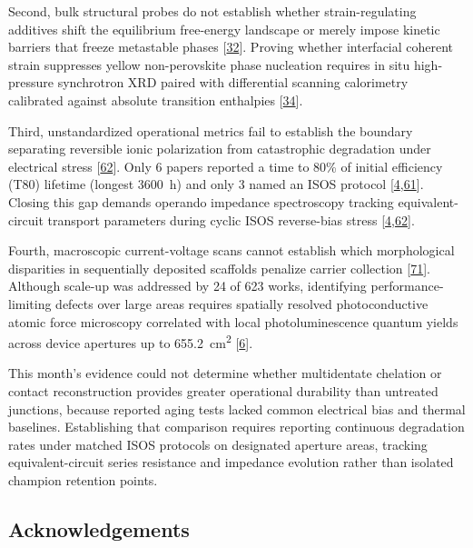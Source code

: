 \documentclass[
  11pt,
]{article}
\begin{document}
Second, bulk structural probes do not establish whether
strain-regulating additives shift the equilibrium free-energy landscape
or merely impose kinetic barriers that freeze metastable phases
{[}\href{https://doi.org/10.22541/authorea.15004927/v1}{32}{]}. Proving
whether interfacial coherent strain suppresses yellow non-perovskite
phase nucleation requires in situ high-pressure synchrotron XRD paired
with differential scanning calorimetry calibrated against absolute
transition enthalpies
{[}\href{https://doi.org/10.1038/s41467-026-73739-0}{34}{]}.

Third, unstandardized operational metrics fail to establish the boundary
separating reversible ionic polarization from catastrophic degradation
under electrical stress
{[}\href{https://doi.org/10.1021/acsenergylett.6c00904}{62}{]}. Only 6
papers reported a time to 80\% of initial efficiency (T80) lifetime
(longest \qty{3600}{\hour}) and only 3 named an ISOS protocol
{[}\href{https://doi.org/10.1126/sciadv.aef6596}{4},\href{https://doi.org/10.1016/j.joule.2026.102538}{61}{]}.
Closing this gap demands operando impedance spectroscopy tracking
equivalent-circuit transport parameters during cyclic ISOS reverse-bias
stress
{[}\href{https://doi.org/10.1126/sciadv.aef6596}{4},\href{https://doi.org/10.1021/acsenergylett.6c00904}{62}{]}.

Fourth, macroscopic current-voltage scans cannot establish which
morphological disparities in sequentially deposited scaffolds penalize
carrier collection
{[}\href{https://doi.org/10.1021/acsami.6c07582}{71}{]}. Although
scale-up was addressed by 24 of 623 works, identifying
performance-limiting defects over large areas requires spatially
resolved photoconductive atomic force microscopy correlated with local
photoluminescence quantum yields across device apertures up to
\qty{655.2}{\centi\meter\squared}
{[}\href{https://doi.org/10.1002/adma.73855}{6}{]}.

This month's evidence could not determine whether multidentate chelation
or contact reconstruction provides greater operational durability than
untreated junctions, because reported aging tests lacked common
electrical bias and thermal baselines. Establishing that comparison
requires reporting continuous degradation rates under matched ISOS
protocols on designated aperture areas, tracking equivalent-circuit
series resistance and impedance evolution rather than isolated champion
retention points.

\subsection{Acknowledgements}\label{acknowledgements}
\end{document}
